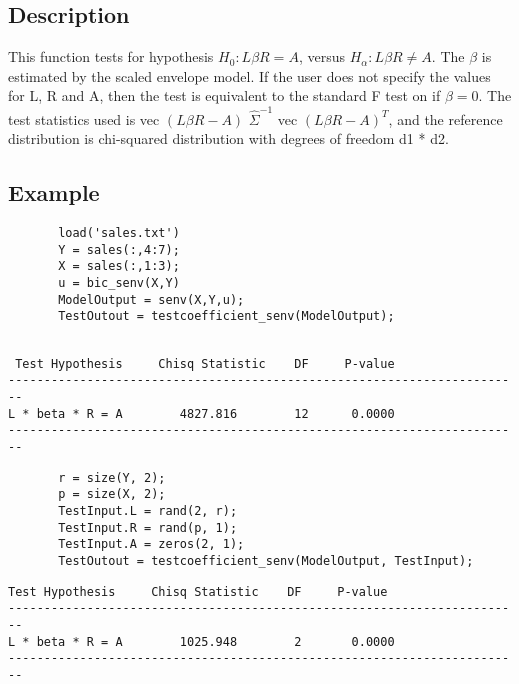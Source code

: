 \documentclass[a4paper,11pt,openany]{memoir}
\begin{document}
\subsection*{Description}

\begin{par}
This function tests for hypothesis $H_0: L\beta R = A$, versus $H_\alpha: L\beta R\neq A$.  The $\beta$ is estimated by the scaled envelope model.  If the user does not specify the values for L, R and A, then the test is equivalent to the standard F test on if $\beta = 0$.  The test statistics used is vec $(L\beta R - A)$ $\hat{\Sigma}^{-1}$ vec $(L\beta R - A)^{T}$, and the reference distribution is chi-squared distribution with degrees of freedom d1 * d2.
\end{par} \vspace{1em}


\subsection*{Example}


\begin{verbatim}       load('sales.txt')
       Y = sales(:,4:7);
       X = sales(:,1:3);
       u = bic_senv(X,Y)
       ModelOutput = senv(X,Y,u);
       TestOutout = testcoefficient_senv(ModelOutput);\end{verbatim}
        \color{lightgray}\ttfamily \begin{verbatim}

 Test Hypothesis     Chisq Statistic    DF     P-value
------------------------------------------------------------------------
L * beta * R = A        4827.816        12      0.0000
------------------------------------------------------------------------
\end{verbatim} \rmfamily
\color{black}
\begin{verbatim}
       r = size(Y, 2);
       p = size(X, 2);
       TestInput.L = rand(2, r);
       TestInput.R = rand(p, 1);
       TestInput.A = zeros(2, 1);
       TestOutout = testcoefficient_senv(ModelOutput, TestInput);\end{verbatim}
         \color{lightgray}\ttfamily \begin{verbatim}
Test Hypothesis     Chisq Statistic    DF     P-value
------------------------------------------------------------------------
L * beta * R = A        1025.948        2       0.0000
------------------------------------------------------------------------
\end{verbatim} \rmfamily
\color{black}
    
\end{document}
